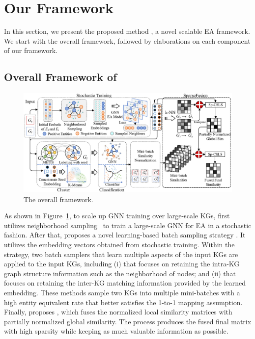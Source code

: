 \section{Our Framework}
\label{sec:framework}
In this section, we present the proposed method \ClusterEA{}, a novel scalable EA framework. We start with the overall framework, followed by elaborations on each component of our framework.

\subsection{Overall Framework of \ClusterEAplain{}}

\begin{figure}[t]
\centering
\includegraphics[width=6.in]{figs/framework.eps}
\vspace{-2mm}
\caption{The overall \ClusterEAplain{} framework.}
\label{fig:framewrok}
\vspace*{-4mm}
\end{figure}

As shown in Figure~\ref{fig:framewrok}, to scale up GNN training over large-scale KGs, \ClusterEA{} first utilizes neighborhood sampling~\cite{GraphSAGE17} to train a large-scale GNN for EA in a stochastic fashion.
After that, \ClusterEA{} proposes a novel learning-based batch sampling strategy \Sampling{}. It utilizes the embedding vectors obtained from stochastic training. Within the strategy, two batch samplers that learn multiple aspects of the input KGs are applied to the input KGs, including
(i) \MetisGCN{} that focuses on retaining the intra-KG graph structure information such as the neighborhood of nodes; and 
(ii) \KMeans{} that focuses on retaining the inter-KG matching information provided by the learned embedding.
These methods sample two KGs into multiple mini-batches with a high entity equivalent rate that better satisfies the 1-to-1 mapping assumption. 
Finally, \ClusterEA{} proposes \Merging{}, which fuses the normalized local similarity matrices with partially normalized global similarity. The \Merging{} process produces the fused final matrix with high sparsity while keeping as much valuable information as possible. 

